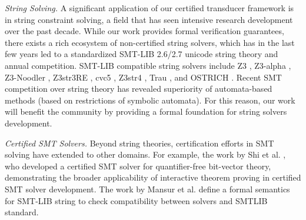 \emph{String Solving.} A significant application of our certified transducer
framework is in string constraint solving, a field that has seen intensive
research development over the past decade. While our work provides formal
verification guarantees, there exists a rich ecosystem of non-certified string
solvers, which has in the last few years led to a standardized SMT-LIB 2.6/2.7 
unicode string theory and annual competition. SMT-LIB compatible string 
solvers include Z3 \cite{z3}, Z3-alpha \cite{z3alpha}, Z3-Noodler 
\cite{noodler,noodler-int,noodler-len, noodler-tool}, Z3str3RE \cite{z3str3re},
cvc5 \cite{cvc5}, Z3str4 \cite{z3str4}, Trau \cite{trau0,trau-tool,trau2}, and 
OSTRICH \cite{ostrich}. Recent SMT competition over string theory has revealed
superiority of automata-based methods (based on restrictions of symbolic
automata). For this reason,
our work will benefit the community by providing a formal 
foundation for string solvers development.



\emph{Certified SMT Solvers.} Beyond string theories, certification efforts in SMT solving have extended to other domains. For example, the work by Shi et al. \cite{DBLP:conf/cav/ShiFLTWY20}, who developed a certified SMT solver for quantifier-free bit-vector theory, demonstrating the broader applicability of interactive theorem proving in certified SMT solver development. The work by Mansur et al. \cite{verified-verifying} define a formal semantics for SMT-LIB string
to check compatibility between solvers and SMTLIB standard.
